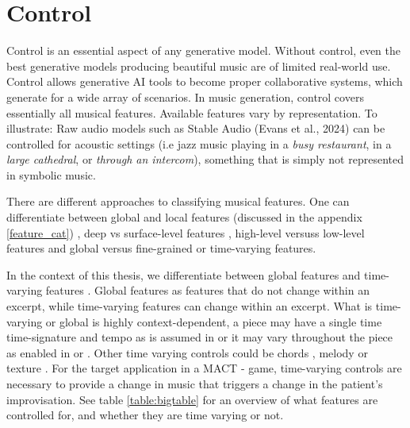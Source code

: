 \section{Control} \label{section:control}
Control is an essential aspect of any generative model. Without control, even the best generative models producing beautiful music are of limited real-world use. Control allows generative AI tools to become proper collaborative systems, which generate for a wide array of scenarios. In music generation, control covers essentially all musical features. Available features vary by representation. To illustrate:
Raw audio models such as Stable Audio (Evans et al., 2024) can be controlled for acoustic settings (i.e jazz music playing in a \textit{busy restaurant}, in a \textit{large cathedral}, or \textit{through an intercom}), something that is simply not represented in symbolic music. 

There are different approaches to classifying musical features. 
One can differentiate between global and local features (discussed in the appendix \ref{feature_cat}) \cite{Van_Kranenburg_Volk_Wiering_2013}, 
deep vs surface-level features \cite{Blacking_1971}, high-level versuss low-level features \cite{Tan_Herremans_2020} and global versus fine-grained or time-varying features. 

In the context of this thesis, we differentiate between global features and time-varying features \cite{Rütte_figaro_2023}. Global features as features that do not change within an excerpt, while time-varying features can change within an excerpt. What is time-varying or global is highly context-dependent, a piece may have a single time time-signature and tempo as is assumed in \cite{Lu_Xu_Kang_Yu_Xing_Tan_Bian_MuseCoco_2023} or it may vary throughout the piece as enabled in \cite{Rütte_figaro_2023} or \cite{Huang_Yang_remi_pop_transformer_2020}. Other time varying controls could be chords \cite{Rütte_figaro_2023}\cite{Wu_Donahue_musicontrolnet_2023}\cite{Lan_Hsiao_Cheng_Yang_musicongen_2024}\cite{Min_Jiang_Xia_Zhao_polyffusion_2023}, melody \cite{copet2023simple}\cite{Min_Jiang_Xia_Zhao_polyffusion_2023} or texture \cite{Min_Jiang_Xia_Zhao_polyffusion_2023}. For the target application in a MACT - game, time-varying controls are necessary to provide a change in music that triggers a change in the patient's improvisation. See table \ref{table:bigtable} for an overview of what features are controlled for, and whether they are time varying or not. 



